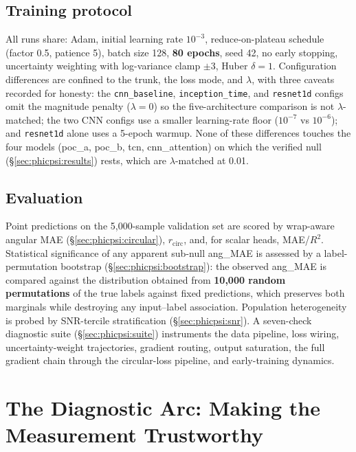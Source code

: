 \subsection{Training protocol}
\label{sec:phicpsi:protocol}

All runs share: Adam, initial learning rate $10^{-3}$, reduce-on-plateau schedule (factor 0.5, patience 5), batch size 128, \textbf{80 epochs}, seed 42, no early stopping, uncertainty weighting with log-variance clamp $\pm 3$, Huber $\delta = 1$.
Configuration differences are confined to the trunk, the loss mode, and $\lambda$, with three caveats recorded for honesty: the \texttt{cnn\_baseline}, \texttt{inception\_time}, and \texttt{resnet1d} configs omit the magnitude penalty ($\lambda = 0$) so the five-architecture comparison is not $\lambda$-matched; the two CNN configs use a smaller learning-rate floor ($10^{-7}$ vs $10^{-6}$); and \texttt{resnet1d} alone uses a 5-epoch warmup.
None of these differences touches the four models (poc\_a, poc\_b, tcn, cnn\_attention) on which the verified null (\S\ref{sec:phicpsi:results}) rests, which are $\lambda$-matched at 0.01.

\subsection{Evaluation}
\label{sec:phicpsi:evaluation}

Point predictions on the 5{,}000-sample validation set are scored by wrap-aware angular MAE (\S\ref{sec:phicpsi:circular}), $r_{\mathrm{circ}}$, and, for scalar heads, MAE/$R^2$.
Statistical significance of any apparent sub-null ang\_MAE is assessed by a label-permutation bootstrap (\S\ref{sec:phicpsi:bootstrap}): the observed ang\_MAE is compared against the distribution obtained from \textbf{10{,}000 random permutations} of the true labels against fixed predictions, which preserves both marginals while destroying any input--label association.
Population heterogeneity is probed by SNR-tercile stratification (\S\ref{sec:phicpsi:snr}).
A seven-check diagnostic suite (\S\ref{sec:phicpsi:suite}) instruments the data pipeline, loss wiring, uncertainty-weight trajectories, gradient routing, output saturation, the full gradient chain through the circular-loss pipeline, and early-training dynamics.


\section{The Diagnostic Arc: Making the Measurement Trustworthy}
\label{sec:phicpsi:arc}

